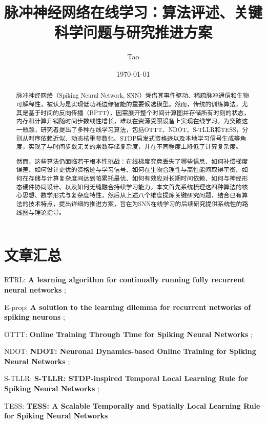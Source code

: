 \documentclass[journal,12pt,onecolumn]{IEEEtran}
\begin{document}
\title{脉冲神经网络在线学习：算法评述、关键科学问题与研究推进方案}


\author{Tao}
\date{\today}

\maketitle

\begin{abstract}
脉冲神经网络（Spiking Neural Network, SNN）凭借其事件驱动、稀疏脉冲通信和生物可解释性，被认为是实现低功耗边缘智能的重要候选模型。然而，传统的训练算法，尤其是基于时间的反向传播（BPTT），因需展开整个时间计算图并存储所有时刻的状态，内存和计算开销随时间步数线性增长，难以在资源受限设备上实现在线学习。为突破这一瓶颈，研究者提出了多种在线学习算法，包括OTTT、NDOT、S-TLLR和TESS，分别从时序依赖近似、动态核重参数化、STDP启发式资格迹以及本地学习信号生成等角度，实现了与时间步数无关的常数存储复杂度，并在不同程度上降低了计算复杂度。

然而，这些算法仍面临若干根本性挑战：在线梯度究竟丢失了哪些信息、如何补偿梯度误差、如何设计更优的资格迹与学习信号、如何在生物合理性与高性能间取得平衡、如何在存储与计算复杂度间达到帕累托最优、如何有效应对长期时间依赖、如何与神经形态硬件协同设计、以及如何无缝融合持续学习能力。本文首先系统梳理这四种算法的核心思想、数学形式与复杂度特性，然后从上述八个维度提炼关键研究问题，结合已有算法的技术特点，提出详细的推进方案，旨在为SNN在线学习的后续研究提供系统性的路线图与理论指导。
\end{abstract}

\section*{文章汇总}

RTRL: \textbf{A learning algorithm for continually running fully recurrent neural networks} \cite{williams1989learning};

E-prop: \textbf{A solution to the learning dilemma for recurrent networks of spiking neurons} \cite{bellec_solution_2020};

OTTT: \textbf{Online Training Through Time for Spiking Neural Networks} \cite{xiao_online_2022};

NDOT: \textbf{NDOT: Neuronal Dynamics-based Online Training for Spiking Neural Networks} \cite{jiang_ndot_nodate};

S-TLLR: \textbf{S-TLLR: STDP-inspired Temporal Local Learning Rule for Spiking Neural Networks} \cite{apolinario_s-tllr_2024};

TESS: \textbf{TESS: A Scalable Temporally and Spatially Local Learning Rule for Spiking Neural Networks} \cite{apolinario_tess_2025}
\end{document}
